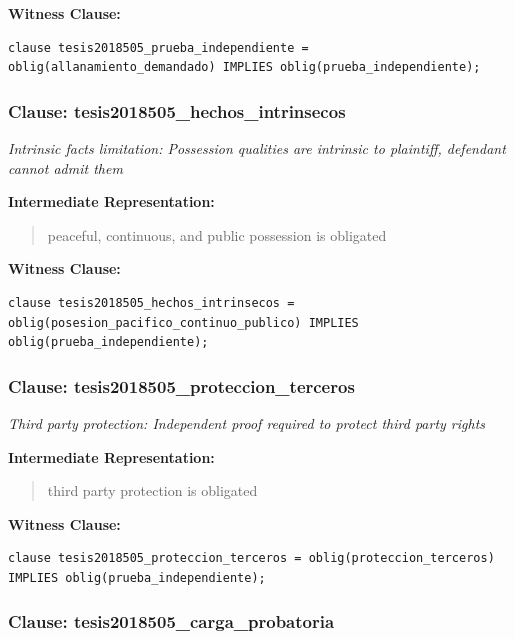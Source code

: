 \documentclass[11pt,a4paper]{article}
\begin{document}
\textbf{Witness Clause:}

\begin{lstlisting}[style=witnessstyle, language=Witness]
clause tesis2018505_prueba_independiente = oblig(allanamiento_demandado) IMPLIES oblig(prueba_independiente);
\end{lstlisting}

\subsubsection{Clause: tesis2018505\_hechos\_intrinsecos}

\textit{Intrinsic facts limitation: Possession qualities are intrinsic to plaintiff, defendant cannot admit them}

\textbf{Intermediate Representation:}

\begin{quote}
peaceful, continuous, and public possession is obligated
\end{quote}

\textbf{Witness Clause:}

\begin{lstlisting}[style=witnessstyle, language=Witness]
clause tesis2018505_hechos_intrinsecos = oblig(posesion_pacifico_continuo_publico) IMPLIES oblig(prueba_independiente);
\end{lstlisting}

\subsubsection{Clause: tesis2018505\_proteccion\_terceros}

\textit{Third party protection: Independent proof required to protect third party rights}

\textbf{Intermediate Representation:}

\begin{quote}
third party protection is obligated
\end{quote}

\textbf{Witness Clause:}

\begin{lstlisting}[style=witnessstyle, language=Witness]
clause tesis2018505_proteccion_terceros = oblig(proteccion_terceros) IMPLIES oblig(prueba_independiente);
\end{lstlisting}

\subsubsection{Clause: tesis2018505\_carga\_probatoria}
\end{document}
